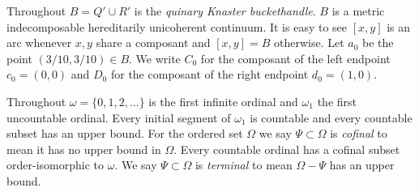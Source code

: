 \documentclass[12pt]{article}
\theoremstyle{plain}
\theoremstyle{definition}
\newcommand{\W}{\ensuremath{\omega}}
\newcommand{\WW}{\ensuremath{\Omega}}
\newcommand{\0}{\ensuremath{\varnothing}}
\begin{document}
	
	Throughout $B = Q' \cup R'$ is the \textit{quinary Knaster buckethandle}.
	$B$ is a metric indecomposable hereditarily unicoherent continuum.
	It is easy to see $[x,y]$ is an arc whenever $x,y$ share a composant and $[x,y] = B$ otherwise.
	Let $a_0$ be the point $(3/10,3/10) \in B$.
	We write $C_0$ for the composant of the left endpoint $c_0 = (0,0)$
	and $D_0$ for the composant of the right endpoint $d_0 = (1,0)$.
	
	Throughout $\W = \{0,1,2, \ldots\}$ is the first infinite ordinal and $\W_1$ the first uncountable ordinal.
	Every initial segment of $\W_1$ is countable and every countable subset has an upper bound.
	For the ordered set $\WW$ we say $\Psi \subset \WW$ is \textit{cofinal} to mean it has no upper bound in $\WW$.
	Every countable ordinal has a cofinal subset order-isomorphic to $\W$.
	We say $\Psi \subset \WW$ is \textit{terminal} to mean $\WW - \Psi$ has an upper bound.
	
\end{document}
